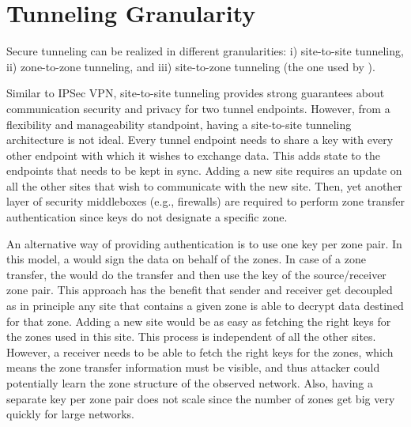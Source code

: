 \section{Tunneling Granularity} %
\label{sec:granularity}
Secure tunneling can be realized in different granularities: i) site-to-site tunneling,
ii) zone-to-zone tunneling, and iii) site-to-zone tunneling (the one used by \name).

Similar to IPSec VPN, site-to-site tunneling provides strong guarantees about communication
security and privacy for two tunnel endpoints.
However, from a flexibility and manageability standpoint, having a site-to-site tunneling
architecture is not ideal. Every tunnel endpoint needs to share a key with every other
endpoint with which it wishes to exchange data. This adds state to the endpoints that
needs to be kept in sync. Adding a new site requires an update on all the other sites that
wish to communicate with the new site. Then, yet another layer of security middleboxes (e.g.,
firewalls) are required to perform zone transfer authentication since keys do not designate a specific zone.

An alternative way of providing authentication is to use one key per zone pair. In this model,
a \tp would sign the data on behalf of the zones. In case of a zone transfer, the \tp
would do the transfer and then use the key of the source/receiver zone pair. This approach
has the benefit that sender and receiver get decoupled as in principle any site that
contains a given zone is able to decrypt data destined for that zone. Adding a new site
would be as easy as fetching the right keys for the zones used in this site. This process
is independent of all the other sites. However, a receiver \tp needs to be able to fetch
the right keys for the zones, which means the zone transfer information must be visible,
and thus attacker could potentially learn the zone structure of the observed network.
Also, having a separate key per zone pair does not scale since the number of zones get big
very quickly for large networks.

